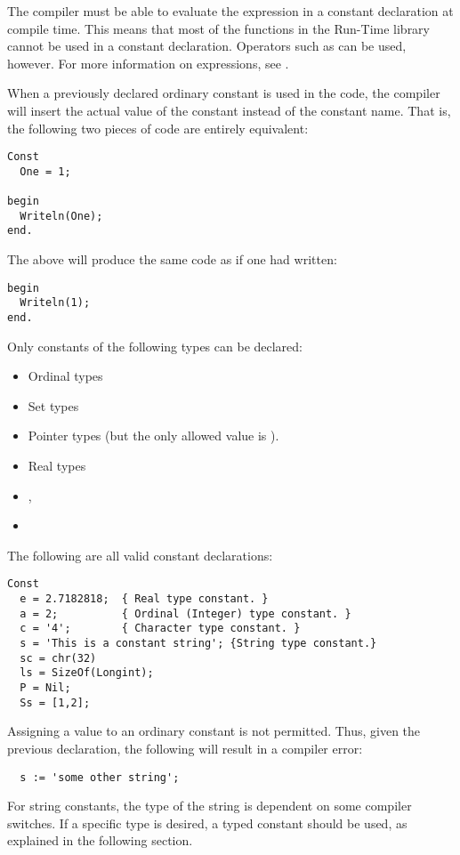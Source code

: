 

The compiler must be able to evaluate the expression in a constant
declaration at compile time.  This means that most of the functions
in the Run-Time library cannot be used in a constant
declaration.
Operators such as  can be used, however.
For more information on expressions, see .

When a previously declared ordinary constant is used in the code, the compiler will insert
the actual value of the constant instead of the constant name. That is, the
following two pieces of code are entirely equivalent:

\begin{verbatim}
Const
  One = 1;

begin
  Writeln(One);
end.
\end{verbatim}
The above will produce the same code as if one had written:
\begin{verbatim}
begin
  Writeln(1);
end.
\end{verbatim}

Only constants of the following types can be declared:

\begin{itemize}
\item Ordinal types
\item Set types
\item Pointer types (but the only allowed value is ).
\item Real types
\item {},
\item {}
\end{itemize}

The following are all valid constant declarations:
\begin{verbatim}
Const
  e = 2.7182818;  { Real type constant. }
  a = 2;          { Ordinal (Integer) type constant. }
  c = '4';        { Character type constant. }
  s = 'This is a constant string'; {String type constant.}
  sc = chr(32)
  ls = SizeOf(Longint);
  P = Nil;
  Ss = [1,2];
\end{verbatim}
Assigning a value to an ordinary constant is not permitted.
Thus, given the previous declaration, the following will result
in a compiler error:
\begin{verbatim}
  s := 'some other string';
\end{verbatim}
For string constants, the type of the string is dependent on some compiler
switches. If a specific type is desired, a typed constant should be used,
as explained in the following section.

